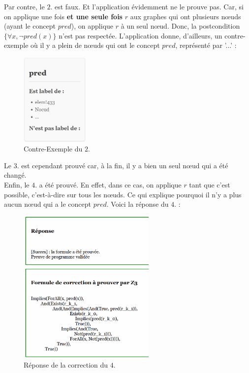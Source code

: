\documentclass[11pt,a4paper]{article}
\begin{document}
Par contre, le $2.$ est faux. Et l'application évidemment ne le prouve pas. Car, si on applique une fois \textbf{et une seule fois} $r$ aux graphes qui ont plusieurs nœuds (ayant le concept $pred$), on applique $r$ à un seul nœud. Donc, la postcondition $\{\forall x, \lnot pred(x)\}$ n'est pas respectée. L'application donne, d'ailleurs, un contre-exemple où il y a plein de nœuds qui ont le concept $pred$, représenté par '...' :

\begin{figure}[htbp]
  \centering
  \includegraphics[width=0.3\textwidth]{screen114.png}
  \caption{Contre-Exemple du $2.$}
  \label{fig:mon_image}
\end{figure}

Le $3.$ est cependant prouvé car, à la fin, il y a bien un seul nœud qui a été changé.\\

Enfin, le $4.$ a été prouvé. En effet, dans ce cas, on applique $r$ tant que c'est possible, c'est-à-dire sur tous les nœuds. Ce qui explique pourquoi il n'y a plus aucun nœud qui a le concept $pred$. Voici la réponse du $4.$ :
\begin{figure}[htbp]
  \centering
  \includegraphics[width=0.6\textwidth]{screen3.png}
  \caption{Réponse de la correction du $4.$}
  \label{fig:mon_image}
\end{figure}
\end{document}
